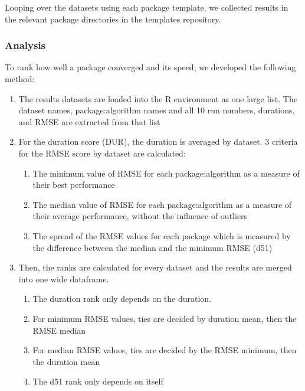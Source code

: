 Looping over the datasets using each package template, we collected
results in the relevant package directories in the templates repository.

\hypertarget{analysis}{%
\subsubsection{Analysis}\label{analysis}}

To rank how well a package converged and its speed, we developed the
following method:

\begin{enumerate}
\def\labelenumi{\arabic{enumi}.}
\tightlist
\item
  The results datasets are loaded into the R environment as one large
  list. The dataset names, package:algorithm names and all 10 run
  numbers, durations, and RMSE are extracted from that list
\item
  For the duration score (DUR), the duration is averaged by dataset. 3
  criteria for the RMSE score by dataset are calculated:

  \begin{enumerate}
  \def\labelenumii{\alph{enumii}.}
  \tightlist
  \item
    The minimum value of RMSE for each package:algorithm as a measure of
    their best performance
  \item
    The median value of RMSE for each package:algorithm as a measure of
    their average performance, without the influence of outliers
  \item
    The spread of the RMSE values for each package which is measured by
    the difference between the median and the minimum RMSE (d51)
  \end{enumerate}
\item
  Then, the ranks are calculated for every dataset and the results are
  merged into one wide dataframe.

  \begin{enumerate}
  \def\labelenumii{\alph{enumii}.}
  \tightlist
  \item
    The duration rank only depends on the duration.
  \item
    For minimum RMSE values, ties are decided by duration mean, then the
    RMSE median
  \item
    For median RMSE values, ties are decided by the RMSE minimum, then
    the duration mean
  \item
    The d51 rank only depends on itself
  \end{enumerate}
\end{enumerate}

